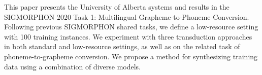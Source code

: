 This paper presents the University of Alberta systems and results in the SIGMORPHON 2020 Task 1: Multilingual Grapheme-to-Phoneme Conversion. Following previous SIGMORPHON shared tasks, we define a low-resource setting with 100 training instances. We experiment with three transduction approaches in both standard and low-resource settings, as well as on the related task of phoneme-to-grapheme conversion. We propose a method for synthesizing training data using a combination of diverse models.
